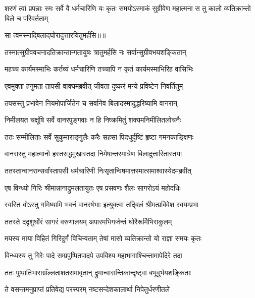 \threelineshloka
{शरणं त्वां प्रपन्नाः स्मः सर्वे वै धर्मचारिणि}
{यः कृतः समयोऽस्माकं सुग्रीवेण महात्मना}
{स तु कालो व्यतिक्रान्तो बिले च परिवर्तताम्} %

{सा त्वमस्माद्बिलाद्घोरादुत्तारयितुमर्हसि॥॥} %

\addtocounter{shlokacount}{1}

\twolineshloka
{तस्मात्सुग्रीववचनादतिक्रान्तान्गतायुषः}
{त्रातुमर्हसि नः सर्वान्सुग्रीवभयशङ्कितान्} %

\twolineshloka
{महच्च कार्यमस्माभिः कर्तव्यं धर्मचारिणि}
{तच्चापि न कृतं कार्यमस्माभिरिह वासिभिः} %

\twolineshloka
{एवमुक्ता हनुमता तापसी वाक्यमब्रवीत्}
{जीवता दुष्करं मन्ये प्रविष्टेन निवर्तितुम्} %

\twolineshloka
{तपसस्तु प्रभावेन नियमोपार्जितेन च}
{सर्वानेव बिलादस्मादुद्धरिष्यामि वानरान्} %

\twolineshloka
{निमीलयत चक्षूंषि सर्वे वानरपुङ्गवाः}
{न हि निष्क्रमितुं शक्यमनिमीलितलोचनैः} %

\twolineshloka
{ततः सम्मीलिताः सर्वे सुकुमाराङ्गुलैः करैः}
{सहसा पिदधुर्दृष्टिं हृष्टा गमनकाङ्क्षिणः} %

\twolineshloka
{वानरास्तु महात्मानो हस्तरुद्धमुखास्तदा}
{निमेषान्तरमात्रेण बिलादुत्तारितास्तया} %

\twolineshloka
{ततस्तान्वानरान्सर्वांस्तापसी धर्मचारिणी}
{निःसृतान्विषमात्तस्मात्समाश्वास्येदमब्रवीत्} %

\twolineshloka
{एष विन्ध्यो गिरिः श्रीमान्नानाद्रुमलतायुतः}
{एष प्रसवणः शैलः सागरोऽयं महोदधिः} %

\twolineshloka
{स्वस्ति वोऽस्तु गमिष्यामि भवनं वानरर्षभाः}
{इत्युक्त्वा तद्बिलं श्रीमत्प्रविवेश स्वयम्प्रभा} %

\twolineshloka
{ततस्ते ददृशुर्घोरं सागरं वरुणालयम्}
{अपारमभिगर्जन्तं घोरैरूर्मिभिराकुलम्} %

\twolineshloka
{मयस्य माया विहितं गिरिदुर्गं विचिन्वताम्}
{तेषां मासो व्यतिक्रान्तो यो राज्ञा समयः कृतः} %

\twolineshloka
{विन्ध्यस्य तु गिरेः पादे सम्प्रपुष्पितपादपे}
{उपविश्य महाभागाश्चिन्तामापेदिरे तदा} %

\twolineshloka
{ततः पुष्पातिभाराग्राँल्लताशतसमावृतान्}
{द्रुमान्वासन्तिकान्दृष्ट्वा बभूवुर्भयशङ्किताः} %

\twolineshloka
{ते वसन्तमनुप्राप्तं प्रतिवेद्य परस्परम्}
{नष्टसन्देशकालार्था निपेतुर्धरणीतले} %

